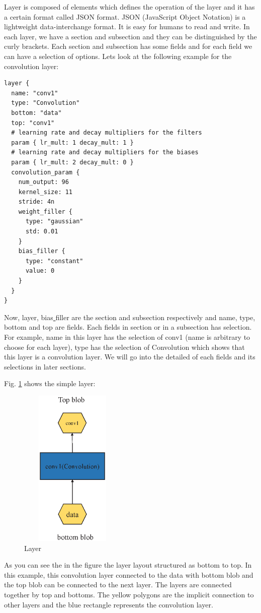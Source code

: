 \documentclass[12pt]{article}
\begin{document}
Layer is composed of elements which defines the operation of the layer and it has a certain format called JSON format. JSON (JavaScript Object Notation) is a lightweight data-interchange format. It is easy for humans to read and write. In each layer, we have a section and subsection and they can be distinguished by the curly brackets. Each section and subsection has some fields and for each field we can have a selection of options. Lets look at the following example for the convolution layer:

\begin{lstlisting}[style=json, frame=single]
layer {
  name: "conv1"
  type: "Convolution"
  bottom: "data"
  top: "conv1"
  # learning rate and decay multipliers for the filters
  param { lr_mult: 1 decay_mult: 1 }
  # learning rate and decay multipliers for the biases
  param { lr_mult: 2 decay_mult: 0 }
  convolution_param {
    num_output: 96
    kernel_size: 11
    stride: 4n
    weight_filler {
      type: "gaussian"
      std: 0.01
    }
    bias_filler {
      type: "constant"
      value: 0
    }
  }
}
\end{lstlisting}

Now, layer, bias\underline{{ }{ }}filler are the section and subsection respectively and name, type, bottom and top are fields. Each fields in section or in a subsection has selection. For example, name in this layer has the selection of conv1 (name is arbitrary to choose for each layer), type has the selection of Convolution which shows that this layer is a convolution layer. We will go into the detailed of each fields and its selections in later sections.

Fig. \ref{fig:Layer} shows the simple layer:
\begin{figure}
	\centerline{\includegraphics[width=2in, height=3in]{fig/layer.eps}}
	\caption{Layer}
	\label{fig:Layer}
\end{figure}
As you can see the in the figure the layer layout structured as bottom to top. In this example, this convolution layer connected to the data with bottom blob and the top blob can be connected to the next layer. The layers are connected together by top and bottoms. The yellow polygons are the implicit connection to other layers and the blue rectangle represents the convolution layer.
\end{document}
